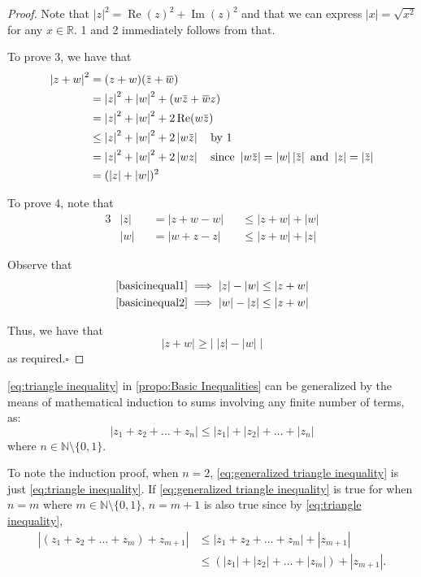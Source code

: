 \documentclass[11pt, oneside]{book}
\theoremstyle{break}
\newtheorem*{proof}{Proof}
\DeclareMathOperator{\re}{Re}
\DeclareMathOperator{\im}{Im}
\newcommand{\qed}{\hfill\ensuremath{\square}}   %
\newcommand{\abs}[1]{\left|#1\right|}						%
\renewcommand{\bar}[1]{\mkern 1.5mu \overline{\mkern -1.5mu #1 \mkern -1.5mu} \mkern 1.5mu}
\begin{document}
\begin{proof}
	Note that $\abs{z}^2 = \re(z)^2 + \im(z)^2$ and that we can express $\abs{x} = \sqrt{x^2}$ for any $x \in \mathbb{R} $. 1 and 2 immediately follows from that.

	To prove 3, we have that
	\begin{align*}
		\abs{z + w}^2 &= (z + w)(\bar{z} + \bar{w}) \\
									&= \abs{z}^2 + \abs{w}^2 + (w\bar{z} + \bar{w}z) \\
									&= \abs{z}^2 + \abs{w}^2 + 2\re(w\bar{z}) \\
									&\leq \abs{z}^2 + \abs{w}^2 + 2\abs{w\bar{z}} \quad \text{by 1} \\
									&= \abs{z}^2 + \abs{w}^2 + 2\abs{wz} \quad \text{since } \abs{w\bar{z}} = \abs{w}\abs{\bar{z}} \text{ and } \abs{z} = \abs{\bar{z}} \\
									&= (\abs{z} + \abs{w})^2
	\end{align*}
	
	To prove 4, note that
	\begin{alignat}{3}
		&\abs{z} &&= \abs{z + w - w} &&\leq \abs{z + w} + \abs{w} \label{basicinequal1} \\
		&\abs{w} &&= \abs{w + z - z} &&\leq \abs{z + w} + \abs{z} \label{basicinequal2}
	\end{alignat}

	Observe that
	\begin{align*}
		\cref{basicinequal1} \implies \abs{z} - \abs{w} \leq \abs{z + w} \\
		\cref{basicinequal2} \implies \abs{w} - \abs{z} \leq \abs{z + w}
	\end{align*}

	Thus, we have that
	\begin{equation*}
		\abs{z + w} \geq \abs{\; \abs{z} - \abs{w} \;}
	\end{equation*}
	as required.\qed
\end{proof}

\cref{eq:triangle inequality} in \cref{propo:Basic Inequalities} can be generalized by the means of mathematical induction to sums involving any finite number of terms, as:
\begin{equation}\label{eq:generalized triangle inequality}
	\abs{z_1 + z_2 + \hdots + z_n} \leq \abs{z_1} + \abs{z_2} + \hdots + \abs{z_n}
\end{equation}
where $n \in \mathbb{N} \setminus \{0, 1\}$.

To note the induction proof, when $n = 2$, \cref{eq:generalized triangle inequality} is just \cref{eq:triangle inequality}. If \cref{eq:generalized triangle inequality} is true for when $n = m$ where $m \in \mathbb{N} \setminus \{0, 1\}$, $n = m + 1$ is also true since by \cref{eq:triangle inequality},
\begin{align*}
	\abs{(z_1 + z_2 + \hdots + z_m) + z_{m+1}} &\leq \abs{z_1 + z_2 + \hdots + z_m} + \abs{z_{m + 1}} \\
			&\leq (\abs{z_1} + \abs{z_2} + \hdots + \abs{z_m}) + \abs{z_{m+1}}.
\end{align*}
\end{document}
